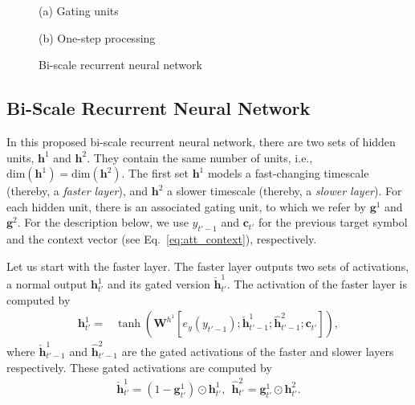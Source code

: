 \documentclass[11pt]{article}
\newcommand{\vect}[1]{\mathbf{#1}}
\newcommand{\matr}[1]{\mathbf{#1}}
\newcommand{\vc}[0]{\vect{c}}
\newcommand{\vh}[0]{\vect{h}}
\newcommand{\vg}[0]{\vect{g}}
\newcommand{\mW}[0]{\matr{W}}
\begin{document}
\begin{figure}
\begin{minipage}{1.\columnwidth}
\begin{minipage}{0.46\columnwidth}
        \end{minipage}
    \end{minipage}
    \begin{minipage}{1.\columnwidth}
        \begin{minipage}{0.48\columnwidth}
            \centering
            (a) Gating units
        \end{minipage}
        \begin{minipage}{0.48\columnwidth}
            \centering
            (b) One-step processing
        \end{minipage}
    \end{minipage}

   
    \caption{Bi-scale recurrent neural network}
    \label{fig:CHDec}

\end{figure}

\subsection{Bi-Scale Recurrent Neural Network}

In this proposed bi-scale recurrent neural network, there are two sets of hidden
units, $\vh^1$ and $\vh^2$. They contain the same number of units, i.e.,
$\text{dim}(\vh^1) = \text{dim}(\vh^2)$. The first set $\vh^1$ models a
fast-changing timescale (thereby, a {\em faster layer}), and $\vh^2$ a slower
timescale (thereby, a {\em slower layer}). For each hidden unit, there is an
associated gating unit, to which we refer by $\vg^1$ and $\vg^2$. For the
description below, we use $y_{t'-1}$ and $\vc_{t'}$ for the previous target symbol
and the context vector (see Eq.~\eqref{eq:att_context}), respectively.

Let us start with the faster layer. The faster layer outputs two sets of
activations, a normal output $\vh^1_{t'}$ and its gated version
$\check{\vh}^1_{t'}$. The activation of the faster layer is computed by
\begin{align*}
    \vh^1_{t'} =& \tanh\left( 
    \mW^{h^1} \left[ e_y(y_{t'-1}); \check{\vh}^1_{t'-1};
    \hat{\vh}^2_{t'-1}; \vc_{t'}\right] 
    \right),
\end{align*}
where $\check{\vh}^1_{t'-1}$ and $\hat{\vh}^2_{t'-1}$ are the gated activations
of the faster and slower layers respectively.  These gated activations are
computed by
\begin{align*}
    \check{\vh}^1_{t'} = (1 - \vg^1_{t'}) \odot \vh^1_{t'},~~\hat{\vh}^2_{t'} = \vg^1_{t'} \odot \vh^2_{t'}.
\end{align*}
\end{document}

